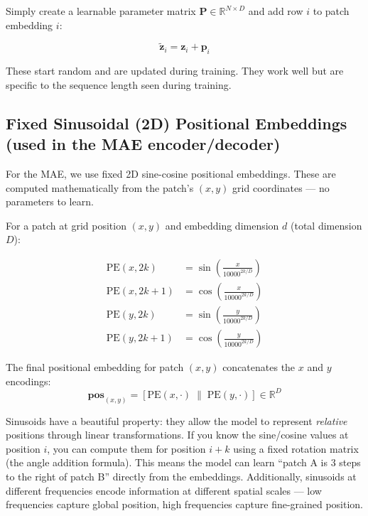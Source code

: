 \documentclass[12pt, a4paper]{report}
\newcommand{\R}{\mathbb{R}}
\newcommand{\mat}[1]{\mathbf{#1}}
\newcommand{\vect}[1]{\bm{#1}}
\begin{document}
Simply create a learnable parameter matrix $\mat{P} \in \R^{N \times D}$ and add row $i$ to patch embedding $i$:

\begin{equation}
\tilde{\vect{z}}_i = \vect{z}_i + \vect{p}_i
\end{equation}

These start random and are updated during training. They work well but are specific to the sequence length seen during training.

\subsection{Fixed Sinusoidal (2D) Positional Embeddings (used in the MAE encoder/decoder)}

For the MAE, we use fixed 2D sine-cosine positional embeddings. These are computed mathematically from the patch's $(x, y)$ grid coordinates — no parameters to learn.

For a patch at grid position $(x, y)$ and embedding dimension $d$ (total dimension $D$):

\begin{align}
\text{PE}(x, 2k) &= \sin\!\left(\frac{x}{10000^{2k/D}}\right) \\
\text{PE}(x, 2k+1) &= \cos\!\left(\frac{x}{10000^{2k/D}}\right) \\
\text{PE}(y, 2k) &= \sin\!\left(\frac{y}{10000^{2k/D}}\right) \\
\text{PE}(y, 2k+1) &= \cos\!\left(\frac{y}{10000^{2k/D}}\right)
\end{align}

The final positional embedding for patch $(x, y)$ concatenates the $x$ and $y$ encodings:
\begin{equation}
\vect{pos}_{(x,y)} = \left[\text{PE}(x, \cdot) \;\|\; \text{PE}(y, \cdot)\right] \in \R^D
\end{equation}

\begin{intuitionbox}
Sinusoids have a beautiful property: they allow the model to represent \emph{relative} positions through linear transformations. If you know the sine/cosine values at position $i$, you can compute them for position $i+k$ using a fixed rotation matrix (the angle addition formula). This means the model can learn ``patch A is 3 steps to the right of patch B'' directly from the embeddings. Additionally, sinusoids at different frequencies encode information at different spatial scales — low frequencies capture global position, high frequencies capture fine-grained position.
\end{intuitionbox}
\end{document}
